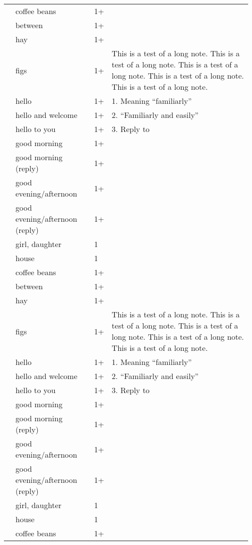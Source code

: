 \documentclass[10pt]{article}
\begin{document}
\begin{center}
\begin{supertabular*}{\textwidth}{p{0.2\textwidth}p{0.3\textwidth}p{1.5em}|p{0.38\textwidth}}
 & coffee beans & 1+ \\
 & between & 1+ \\
 & hay & 1+ \\
 & figs & 1+ & This is a test of a long note. This is a test of a long note. This is a test of a long note. This is a test of a long note. This is a test of a long note. \\
 & hello & 1+  &  1. Meaning ``familiarly'' \\
 & hello and welcome & 1+ & 2. ``Familiarly and easily'' \\
 & hello to you & 1+ & 3. Reply to  \\
 & good morning & 1+ \\
 & good morning (reply) & 1+ \\
 & good evening/afternoon & 1+ \\
 & good evening/afternoon (reply) & 1+ \\
 & girl, daughter & 1 \\
 & house & 1 \\
 & coffee beans & 1+ \\
 & between & 1+ \\
 & hay & 1+ \\
 & figs & 1+ & This is a test of a long note. This is a test of a long note. This is a test of a long note. This is a test of a long note. This is a test of a long note. \\
 & hello & 1+  &  1. Meaning ``familiarly'' \\
 & hello and welcome & 1+ & 2. ``Familiarly and easily'' \\
 & hello to you & 1+ & 3. Reply to  \\
 & good morning & 1+ \\
 & good morning (reply) & 1+ \\
 & good evening/afternoon & 1+ \\
 & good evening/afternoon (reply) & 1+ \\
 & girl, daughter & 1 \\
 & house & 1 \\
 & coffee beans & 1+ \\

\end{supertabular*}
\end{center}
\end{document}
